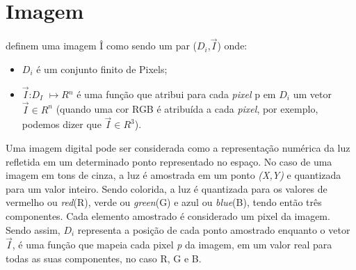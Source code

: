 \section{Imagem}
\label{secao:2:4}

 definem uma imagem Î como sendo um par ($D_i$,$\vec{I}$) onde:

\begin{itemize}
	\item $D_i$ é um conjunto finito de \ac{Pixels};
	\item $\vec{I}$:$D_I$ $\mapsto $${R}$$^n$ é uma função que atribui para cada \textit{pixel} p em $D_i$ um vetor $\vec{I} \in R^n$ (quando uma cor RGB é atribuída a cada \textit{pixel}, por exemplo, podemos dizer que $\vec{I} \in R^3$).
	
\end{itemize}

Uma imagem digital pode ser considerada como a representação numérica da luz refletida em um determinado ponto representado no espaço. No caso de uma imagem em tons de cinza, a luz é amostrada em um ponto \textit{(X,Y)} e quantizada para um valor inteiro. Sendo colorida, a luz é quantizada para os valores de vermelho ou \textit{red}(R), verde ou \textit{green}(G) e azul ou \textsl{blue}(B), tendo então três componentes. Cada elemento amostrado é considerado um pixel da imagem. Sendo assim, \textit{$D_i$} representa a posição de cada ponto amostrado enquanto o vetor \textit{$\vec{I}$}, é uma função que mapeia cada pixel \textit{p} da imagem, em um valor real para todas as suas componentes, no caso R, G e B.







